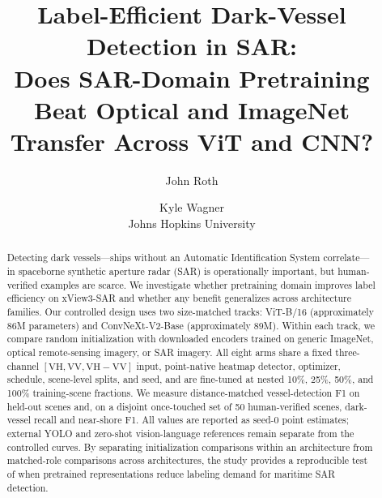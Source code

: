 \documentclass[10pt]{article}
\title{Label-Efficient Dark-Vessel Detection in SAR:\\
Does SAR-Domain Pretraining Beat Optical and ImageNet Transfer Across ViT and CNN?}
\author{John Roth \and Kyle Wagner\\
Johns Hopkins University}
\date{}
\begin{document}
\maketitle

\begin{abstract}
Detecting dark vessels---ships without an Automatic Identification System
correlate---in spaceborne synthetic aperture radar (SAR) is operationally
important, but human-verified examples are scarce. We investigate whether
pretraining domain improves label efficiency on xView3-SAR and whether any
benefit generalizes across architecture families. Our controlled design uses
two size-matched tracks: ViT-B/16 (approximately 86M parameters) and
ConvNeXt-V2-Base (approximately 89M). Within each track, we compare random
initialization with downloaded encoders trained on generic ImageNet, optical
remote-sensing imagery, or SAR imagery. All eight arms share a fixed
three-channel $[\mathrm{VH},\mathrm{VV},\mathrm{VH}{-}\mathrm{VV}]$ input,
point-native heatmap detector, optimizer, schedule, scene-level splits, and
seed, and are fine-tuned at nested 10\%, 25\%, 50\%, and 100\% training-scene
fractions. We measure distance-matched vessel-detection F1 on held-out scenes
and, on a disjoint once-touched set of 50 human-verified scenes, dark-vessel
recall and near-shore F1. All values are reported as seed-0 point estimates;
external YOLO and zero-shot vision-language references remain separate from
the controlled curves. By separating initialization comparisons within an
architecture from matched-role comparisons across architectures, the study
provides a reproducible test of when pretrained representations reduce
labeling demand for maritime SAR detection.
\end{abstract}
\end{document}
